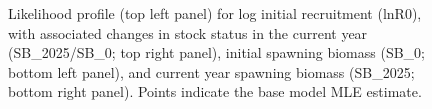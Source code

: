 \documentclass[
]{scrartcl}
\begin{document}
\begin{figure}


\caption{\label{fig-rzero-parm}Likelihood profile (top left panel) for
log initial recruitment (lnR0), with associated changes in stock status
in the current year (SB\_2025/SB\_0; top right panel), initial spawning
biomass (SB\_0; bottom left panel), and current year spawning biomass
(SB\_2025; bottom right panel). Points indicate the base model MLE
estimate.}

\end{figure}%

\clearpage
\end{document}

